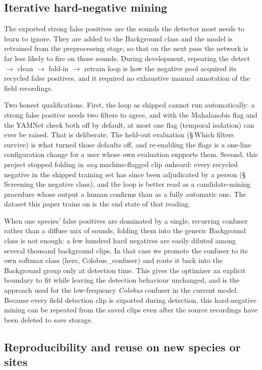 \documentclass[review,3p,times]{elsarticle}
\begin{document}
\subsection*{Iterative hard-negative mining}

The exported strong false positives are the sounds the detector most needs to
learn to ignore. They are added to the Background class and the model is
retrained from the preprocessing stage, so that on the next pass the network
is far less likely to fire on those sounds. During development, repeating the
detect $\rightarrow$ clean $\rightarrow$ fold-in $\rightarrow$ retrain loop is
how the negative pool acquired its recycled false positives, and it required
no exhaustive manual annotation of the field recordings.

Two honest qualifications. First, the loop as shipped cannot run
automatically: a strong false positive needs two filters to agree, and with
the Mahalanobis flag and the YAMNet check both off by default, at most one
flag (temporal isolation) can ever be raised. That is deliberate. The held-out
evaluation (\S\,Which filters survive) is what turned those defaults off, and
re-enabling the flags is a one-line configuration change for a user whose own
evaluation supports them. Second, this project stopped folding in \emph{any}
machine-flagged clip unheard: every recycled negative in the shipped training
set has since been adjudicated by a person (\S\,Screening the negative class),
and the loop is better read as a candidate-mining procedure whose output a
human confirms than as a fully automatic one. The dataset this paper trains on
is the end state of that reading.

When one species' false positives are dominated by a single, recurring
confuser rather than a diffuse mix of sounds, folding them into the generic
Background class is not enough: a few hundred hard negatives are easily diluted
among several thousand background clips. In that case we promote the confuser
to its own softmax class (here, Colobus\_confuser) and route it back
into the Background group only at detection time. This gives the optimizer an
explicit boundary to fit while leaving the detection behaviour unchanged, and
is the approach used for the low-frequency \textit{Colobus} confuser in the
current model. Because every field detection clip is exported during detection,
this hard-negative mining can be repeated from the saved clips even after the
source recordings have been deleted to save storage.

\subsection*{Reproducibility and reuse on new species or sites}
\end{document}
